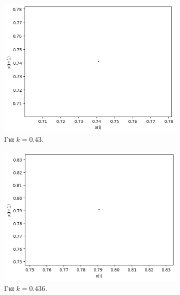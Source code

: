 \begin{figure}[h!]
	\centering
	\begin{subfigure}[b]{0.4\textwidth}
		\centering
		\includegraphics[width=\textwidth]{LateX images/graphs q09/g3}
		\caption{Για $k=0.43$.}
		\label{f:k48}
	\end{subfigure}
	\hfill
	\begin{subfigure}[b]{0.4\textwidth}
		\centering
		\includegraphics[width=\textwidth]{LateX images/graphs q09/g4}
		\caption{Για $k=0.436$.}
		\label{f:k49}
	\end{subfigure}
	\hfill
	\begin{subfigure}[b]{0.4\textwidth}
		\centering

\end{subfigure}
\end{figure}

